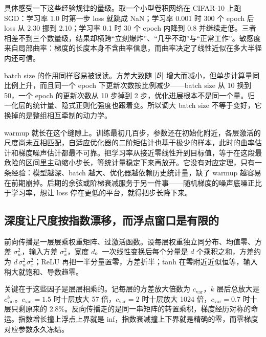 具体感受一下这些经验规律的量级。取一个小型卷积网络在 CIFAR-10 上跑 SGD：学习率 1.0 时第一步 loss 就跳成 NaN；学习率 0.001 时 300 个 epoch 后 loss 从 2.30 挪到 2.10；学习率 0.1 时 30 个 epoch 内降到 0.8 并继续走低。三者相差不到三个数量级，结果却横跨``立刻爆炸''、``几乎不动''与``正常工作''。敏感度来自局部曲率：梯度的长度本身不含曲率信息，而曲率决定了线性近似在多大半径内还可信。

batch size 的作用同样容易被误读。方差大致随 \(\left|\mathcal B\right|\) 增大而减小，但单步计算量同比例上升，而且同一个 epoch 下更新次数按比例减少——batch size 从 10 换到 50，一个 epoch 的更新次数从 10 步掉到 2 步，优化进展根本不是同一个量。归一化层的统计量、隐式正则化强度也跟着变。所以调大 batch size 不等于变好，它换掉的是整组相互牵制的动力学。

warmup 就长在这个缝隙上。训练最初几百步，参数还在初始化附近，各层激活的尺度尚未互相匹配，自适应优化器的二阶矩估计也基于极少的样本，此时的曲率估计和梯度噪声估计都最不可靠。把学习率从接近零线性升到目标值，等于在这段最危险的区间里主动缩小步长，等统计量稳定下来再放开。它没有对应定理，只有一条经验：模型越深、batch 越大、优化器越依赖历史统计量，缺了 warmup 越容易在前期崩掉。后期的余弦或阶梯衰减服务于另一件事——随机梯度的噪声底噪正比于学习率，想让 loss 停在更低的平台，就得把步长降下来。

\subsection{深度让尺度按指数漂移，而浮点窗口是有限的}

前向传播是一层层乘权重矩阵、过激活函数。设每层权重独立同分布、均值零、方差 \(\sigma_w^2\)，输入方差 \(\sigma_x^2\)，宽度 \(d\)。一次线性变换后每个分量是 \(d\) 个乘积之和，方差约为 \(d\,\sigma_w^2\sigma_x^2\)；ReLU 再把一半分量置零，方差折半；tanh 在零附近近似恒等，输入稍大就饱和、导数趋零。

关键在于这些因子是层层相乘的。记每层的方差放大倍数为 \(c_{\mathrm{var}}\)，\(k\) 层后总放大是 \(c_{\mathrm{var}}^{k}\)。\(c_{\mathrm{var}}=1.5\) 时十层放大 57 倍，\(c_{\mathrm{var}}=2\) 时十层放大 1024 倍，\(c_{\mathrm{var}}=0.7\) 时十层只剩原来的 \(2.8\%\)。反向传播走的是同一串矩阵的转置乘积，梯度经历对称的命运。指数增长撞上浮点上界就是 inf，指数衰减撞上下界就是精确的零，而零梯度对应参数永久冻结。

